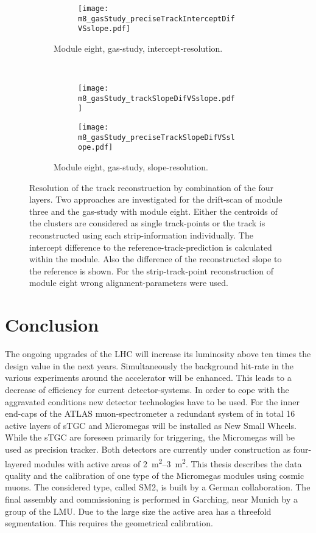 \documentclass[
twoside,            %
BCOR1.4cm,          %
10pt,               %
headings=normal,    %
headsepline,        %
clearplainpage,		%
final,              %
div=14,
open=right,
bibliography=toc
]{scrreprt}
\begin{document}
\begin{figure}[!h]
\begin{subfigure}[b]{\textwidth}
\begin{subfigure}[b]{0.48\textwidth}
			\texttt{[image: m8\_gasStudy\_preciseTrackInterceptDifVSslope.pdf]}
		\end{subfigure}
		\caption{
			Module eight, gas-study, intercept-resolution.
		}
	\end{subfigure}
	\\
	\begin{subfigure}[b]{\textwidth}
		\begin{subfigure}[b]{0.48\textwidth}
			\centering
			\texttt{[image: m8\_gasStudy\_trackSlopeDifVSslope.pdf]}
		\end{subfigure}
		\hfill
		\begin{subfigure}[b]{0.48\textwidth}
			\centering
			\texttt{[image: m8\_gasStudy\_preciseTrackSlopeDifVSslope.pdf]}
		\end{subfigure}
		\caption{
			Module eight, gas-study, slope-resolution.
		}
	\end{subfigure}
	\vspace{-5mm}
	\caption{
		Resolution of the track reconstruction by combination of the four layers.
		Two approaches are investigated for the drift-scan of module three and the gas-study with module eight.
		Either the centroids of the clusters are considered as single track-points or the track is reconstructed using each strip-information individually.
		The intercept difference to the reference-track-prediction is calculated within the module.
		Also the difference of the reconstructed slope to the reference is shown.
		For the strip-track-point reconstruction of module eight wrong alignment-parameters were used.
	}
	\label{fourLayerTrackReconstruction} 
\end{figure}

\chapter{Conclusion}

The ongoing upgrades of the LHC will increase its luminosity above ten times the design value in the next years.
Simultaneously the background hit-rate in the various experiments around the accelerator will be enhanced.
This leads to a decrease of efficiency for current detector-systems.
In order to cope with the aggravated conditions new detector technologies have to be used.
For the inner end-caps of the ATLAS muon-spectrometer a redundant system of in total 16 active layers of sTGC and Micromegas will be installed as New Small Wheels.
While the sTGC are foreseen primarily for triggering, the Micromegas will be used as precision tracker.
Both detectors are currently under construction as four-layered modules with active areas of \SIrange{2}{3}{\square\m}.
This thesis describes the data quality and the calibration of one type of the Micromegas modules using cosmic muons.
The considered type, called SM2, is built by a German collaboration.
The final assembly and commissioning is performed in Garching, near Munich by a group of the LMU.
Due to the large size the active area has a threefold segmentation.
This requires the geometrical calibration.
\end{document}
